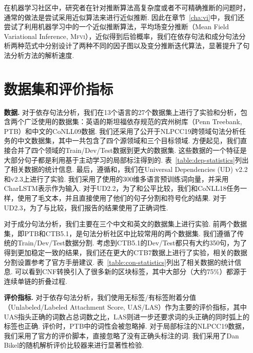 在机器学习社区中，研究者在针对推断算法高复杂度或者不可精确推断的问题时，通常的做法是尝试采用近似算法来进行近似推断.
因此在章节~\ref{cha:vi}中，我们还尝试了利用机器学习中的一个近似推断算法，平均场变分推断（Mean Field Variational Inference, \textsc{Mfvi}），近似得到后验概率，我们在依存句法和成分句法分析两种范式中分别设计了两种不同的因子图以及变分推断迭代算法，显著提升了句法分析方法的解析速度.

\section{数据集和评价指标}



\noindent\textbf{数据.}
对于依存句法分析，我们在13个语言的27个数据集上进行了实验和分析，包含两个广泛使用的数据集：英语的斯坦福依存规范\citep{chen-manning-2014-fast}的宾州树库（Penn Treebank, PTB）和中文的CoNLL09数据\citep{hajic-etal-2009-conll}.
我们还采用了公开于NLPCC19跨领域句法分析任务的中文数据集\citep{peng-etal-2019-overview}，其中一共包含了四个源领域和三个目标领域.
方便起见，我们直接合并了四个领域的Train/Dev/Test数据到更大的数据集.
这些数据的一个特征是大部分句子都是利用基于主动学习的局部标注得到的.
表~\ref{table:dep-statistics}列出了相关数据的统计信息.
最后，遵循\citep{ji-etal-2019-graph}和\citep{zhang-etal-2019-empirical}，我们在Universal Dependencies (UD) v2.2和v2.3上进行了实验.
我们采用了\citet{zeman-etal-2018-conll}使用的300维多语言预训练词向量，并采用CharLSTM表示作为输入.
对于UD2.2，为了和\citet{ji-etal-2019-graph}公平比较，我们和CoNLL18任务一样\citep{zeman-etal-2018-conll}，使用了毛文本，并且直接使用了他们的句子分割和符号化的结果.
对于UD2.3，为了与\citet{zhang-etal-2019-empirical}比较，我们报告的结果使用了正确词性.

对于成分句法分析，我们主要在三个中文和英文的数据集上进行实验.
前两个数据集，即PTB和CTB5.1，是句法分析社区中比较常用的两个数据集.
我们遵循了传统的Train/Dev/Test数据分割.
考虑到CTB5.1的Dev/Test都只有大约350句，为了得到更加稳定一致的结果，我们还在更大的CTB7数据上进行了实验，相关的数据分割设置参考了官方手册建议.
表~\ref{table:con-statistics}列出了相关数据的统计信息.
可以看到CNF转换引入了很多新的区块标签，其中大部分（大约75\%）都源于连续单链的折叠过程.



\noindent\textbf{评价指标.}
对于依存句法分析，我们使用无标签/有标签附着分值（Unlabeled/Labeled Attachment Score, UAS/LAS）作为主要的评价指标，其中UAS指头正确的词数占总词数之比，LAS则进一步还要求词的头正确的同时弧上的标签也正确.
评价时，PTB中的词性会被忽略掉.
对于局部标注的NLPCC19数据，我们采用了官方的评价脚本，直接忽略了没有正确头标注的词.
我们采用了Dan Bikel的随机解析评价比较器来进行显著性检验.

